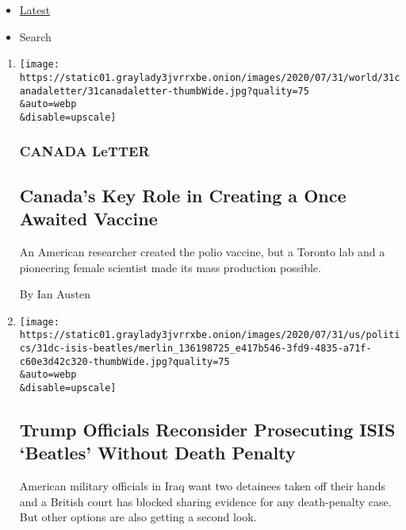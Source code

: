 \begin{itemize}
\tightlist
\item
  \protect\hyperlink{stream-panel}{Latest}
\item
  Search
\end{itemize}

\begin{enumerate}
\def\labelenumi{\arabic{enumi}.}
\item
  \href{/2020/07/31/world/canada/leone-farrell-chemist.html}{}

  \texttt{[image: https://static01.graylady3jvrrxbe.onion/images/2020/07/31/world/31canadaletter/31canadaletter-thumbWide.jpg?quality=75\\\&auto=webp\\\&disable=upscale]}

  \hypertarget{canada-letter}{%
  \subsubsection{CANADA LeTTER}\label{canada-letter}}

  \hypertarget{canadas-key-role-in-creating-a-once-awaited-vaccine}{%
  \subsection{Canada's Key Role in Creating a Once Awaited
  Vaccine}\label{canadas-key-role-in-creating-a-once-awaited-vaccine}}

  An American researcher created the polio vaccine, but a Toronto lab
  and a pioneering female scientist made its mass production possible.

  By Ian Austen
\item
  \href{/2020/07/31/world/middleeast/isis-beatles-hostages.html}{}

  \texttt{[image: https://static01.graylady3jvrrxbe.onion/images/2020/07/31/us/politics/31dc-isis-beatles/merlin\_136198725\_e417b546-3fd9-4835-a71f-c60e3d42c320-thumbWide.jpg?quality=75\\\&auto=webp\\\&disable=upscale]}

  \hypertarget{trump-officials-reconsider-prosecuting-isis-beatles-without-death-penalty}{%
  \subsection{Trump Officials Reconsider Prosecuting ISIS `Beatles'
  Without Death
  Penalty}\label{trump-officials-reconsider-prosecuting-isis-beatles-without-death-penalty}}

  American military officials in Iraq want two detainees taken off their
  hands and a British court has blocked sharing evidence for any
  death-penalty case. But other options are also getting a second look.


\end{enumerate}
